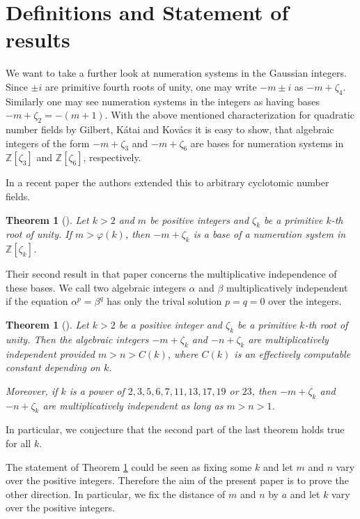 \documentclass{amsart}
\theoremstyle{plain}
\numberwithin{equation}{section}
\newtheorem{theorem}[thm]{Theorem}
\theoremstyle{remark}
\begin{document}
\section{Definitions and Statement of results}
We want to take a further look at numeration systems in the Gaussian
integers. Since $\pm i$ are primitive fourth roots of unity, one may
write $-m\pm i$ as $-m+\zeta_4$. Similarly one may see numeration systems in the integers as having bases $-m+\zeta_2=-(m+1)$. With the above mentioned
characterization for quadratic number fields by Gilbert, K\'atai and
Kov\'acs \cite{gilbert81:_radix,
  katai_kovacs1981:canonical_number_systems,
  katai_kovacs1980:kanonische_zahlensysteme_in} it is easy to show,
that algebraic integers of the form $-m+\zeta_3$ and $-m+\zeta_6$ are bases for numeration systems in ${{\mathbb Z}}[\zeta_3]$ and ${{\mathbb Z}}[\zeta_6]$, respectively.

In a recent paper \cite{Madritsch:2014} the authors extended this to
arbitrary cyclotomic number fields.
\begin{theorem}[{\cite[Theorem 1.1]{Madritsch:2014}}]
  Let $k>2$ and $m$ be positive integers and $\zeta_k$ be a primitive
  $k$-th root of unity. If $m>\varphi(k)$, then $-m+\zeta_k$ is a base
  of a numeration system in ${{\mathbb Z}}[\zeta_k]$.
\end{theorem}

Their second result in that paper \cite{Madritsch:2014} concerns the
multiplicative independence of these bases.  We call two algebraic
integers $\alpha$ and $\beta$ multiplicatively independent if the
equation $\alpha^p=\beta^q$ has only the trival solution $p=q=0$ over
the integers.

\begin{theorem}[{\cite[Theorem 1.2]{Madritsch:2014}}]\label{th:old_mult}
  Let $k>2$ be a positive integer and $\zeta_k$ be a primitive $k$-th
  root of unity. Then the algebraic integers $-m+\zeta_k$ and
  $-n+\zeta_k$ are multiplicatively independent provided $m>n>C(k)$,
  where $C(k)$ is an effectively computable constant depending on $k$.

  Moreover, if $k$ is a power of $2,3,5,6,7,11,13,17,19$ or $23$, then
  $-m+\zeta_k$ and $-n+\zeta_k$ are multiplicatively independent as
  long as $m>n>1$.
\end{theorem}

In particular, we conjecture that the second part of the last theorem
holds true for all $k$.

The statement of Theorem \ref{th:old_mult} could be seen as fixing some
$k$ and let $m$ and $n$ vary over the positive integers. Therefore the
aim of the present paper is to prove the other direction. In
particular, we fix the distance of $m$ and $n$ by $a$ and let $k$ vary
over the positive integers.
\end{document}

